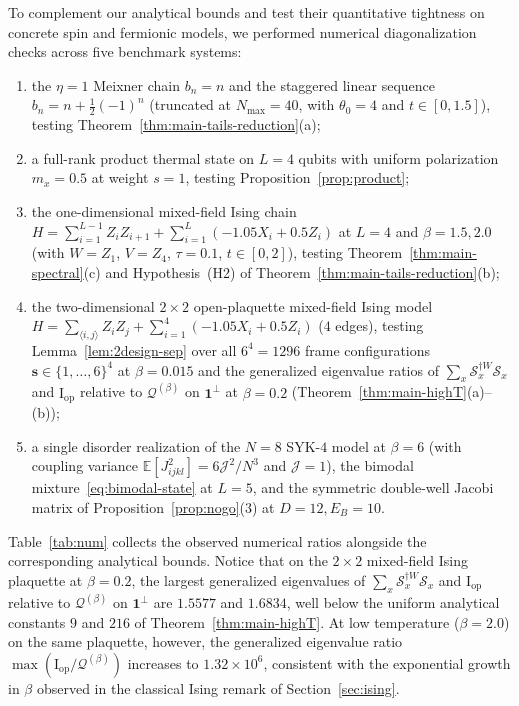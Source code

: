 \documentclass[11pt,a4paper]{article}
\numberwithin{equation}{section}
\theoremstyle{plain}
\theoremstyle{definition}
\newcommand{\E}{\mathbb{E}}
\begin{document}
To complement our analytical bounds and test their quantitative tightness on concrete spin and fermionic models, we performed numerical diagonalization checks across five benchmark systems:
\begin{enumerate}
  \setlength{\itemsep}{2pt}\setlength{\parskip}{0pt}
  \item the $\eta=1$ Meixner chain $b_n = n$ and the staggered linear sequence $b_n = n + \frac{1}{2}(-1)^n$ (truncated at $N_{\max}=40$, with $\theta_0 = 4$ and $t\in[0,1.5]$), testing Theorem~\ref{thm:main-tails-reduction}(a);
  \item a full-rank product thermal state on $L=4$ qubits with uniform polarization $m_x = 0.5$ at weight $s=1$, testing Proposition~\ref{prop:product};
  \item the one-dimensional mixed-field Ising chain $H = \sum_{i=1}^{L-1} Z_i Z_{i+1} + \sum_{i=1}^L (-1.05 X_i + 0.5 Z_i)$ at $L=4$ and $\beta=1.5, 2.0$ (with $W=Z_1$, $V=Z_4$, $\tau=0.1$, $t\in[0,2]$), testing Theorem~\ref{thm:main-spectral}(c) and Hypothesis~(H2) of Theorem~\ref{thm:main-tails-reduction}(b);
  \item the two-dimensional $2\times 2$ open-plaquette mixed-field Ising model $H = \sum_{\langle i,j\rangle} Z_i Z_j + \sum_{i=1}^4 (-1.05 X_i + 0.5 Z_i)$ ($4$ edges), testing Lemma~\ref{lem:2design-sep} over all $6^4 = 1296$ frame configurations $\mathbf{s}\in\{1,\dots,6\}^4$ at $\beta=0.015$ and the generalized eigenvalue ratios of $\sum_x \mathcal{S}_x^{\dagger W}\mathcal{S}_x$ and $\mathrm{I}_{\mathrm{op}}$ relative to $\mathcal{Q}^{(\beta)}$ on $\mathbf{1}^\perp$ at $\beta=0.2$ (Theorem~\ref{thm:main-highT}(a)--(b));
  \item a single disorder realization of the $N=8$ SYK-$4$ model at $\beta=6$ (with coupling variance $\E[J_{ijkl}^2] = 6\mathcal{J}^2/N^3$ and $\mathcal{J}=1$), the bimodal mixture~\eqref{eq:bimodal-state} at $L=5$, and the symmetric double-well Jacobi matrix of Proposition~\ref{prop:nogo}(3) at $D=12, E_B=10$.
\end{enumerate}

Table~\ref{tab:num} collects the observed numerical ratios alongside the corresponding analytical bounds. Notice that on the $2\times 2$ mixed-field Ising plaquette at $\beta = 0.2$, the largest generalized eigenvalues of $\sum_x \mathcal{S}_x^{\dagger W}\mathcal{S}_x$ and $\mathrm{I}_{\mathrm{op}}$ relative to $\mathcal{Q}^{(\beta)}$ on $\mathbf{1}^\perp$ are $1.5577$ and $1.6834$, well below the uniform analytical constants $9$ and $216$ of Theorem~\ref{thm:main-highT}. At low temperature ($\beta = 2.0$) on the same plaquette, however, the generalized eigenvalue ratio $\max(\mathrm{I}_{\mathrm{op}}/\mathcal{Q}^{(\beta)})$ increases to $1.32\times 10^6$, consistent with the exponential growth in $\beta$ observed in the classical Ising remark of Section~\ref{sec:ising}.
\end{document}

